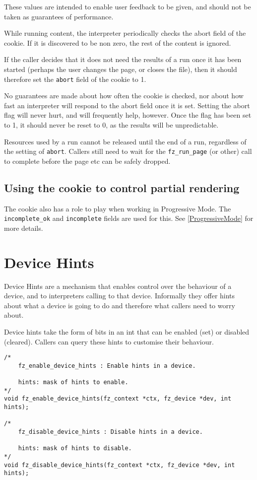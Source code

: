 \documentclass[oneside]{book}
\newcommand{\rjwref}[1] {\autoref{#1} \nameref{#1}}
\begin{document}
These values are intended to enable user feedback to be given, and should not be taken as guarantees of performance.

While running content, the interpreter periodically checks the abort field of the cookie.  If it is discovered to be non zero, the rest of the content is ignored.

If the caller decides that it does not need the results of a run once it has been started (perhaps the user changes the page, or closes the file), then it should therefore set the \texttt{abort} field of the cookie to 1.

No guarantees are made about how often the cookie is checked, nor about how fast an interpreter will respond to the abort field once it is set. Setting the abort flag will never hurt, and will frequently help, however. Once the flag has been set to 1, it should never be reset to 0, as the results will be unpredictable.

Resources used by a run cannot be released until the end of a run, regardless of the setting of \texttt{abort}. Callers still need to wait for the \texttt{fz\_run\_page} (or other) call to complete before the page etc can be safely dropped.

\subsection{Using the cookie to control partial rendering}

The cookie also has a role to play when working in Progressive Mode. The \texttt{incomplete\_ok} and \texttt{incomplete} fields are used for this. See \rjwref{ProgressiveMode} for more details.

\section{Device Hints}
\label{DeviceHints}

Device Hints are a mechanism that enables control over the behaviour of a device, and to interpreters calling to that device. Informally they offer hints about what a device is going to do and therefore what callers need to worry about.

Device hints take the form of bits in an int that can be enabled (set) or disabled (cleared). Callers can query these hints to customise their behaviour.

\begin{lstlisting}
/*
	fz_enable_device_hints : Enable hints in a device.

	hints: mask of hints to enable.
*/
void fz_enable_device_hints(fz_context *ctx, fz_device *dev, int hints);

/*
	fz_disable_device_hints : Disable hints in a device.

	hints: mask of hints to disable.
*/
void fz_disable_device_hints(fz_context *ctx, fz_device *dev, int hints);
\end{lstlisting}
\end{document}
